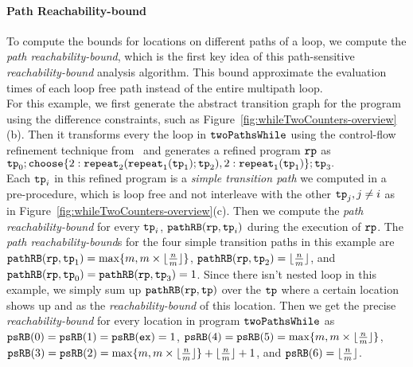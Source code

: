 \paragraph{Path Reachability-bound}
To compute the bounds for locations on different paths of a loop, we compute the \emph{path reachability-bound},
which is the first key idea of this path-sensitive \emph{reachability-bound} analysis algorithm. This bound approximate the evaluation times of each loop free path instead of the entire multipath loop.
\\
For this example, we first
generate the abstract transition graph for the program using the difference constraints, such as Figure~\ref{fig:whileTwoCounters-overview}(b).
Then it transforms every the loop in $\mathtt{twoPathsWhile}$ using the control-flow refinement technique from~\cite{GulwaniJK09} and generates a refined program $\mathtt{rp}$ as
\\
% 
  $
  \tpath_0 ; 
  \rpchoose{2: \rprepeat_2(\rprepeat_1(\tpath_1); \tpath_2), 
  2: \rprepeat_1(\tpath_1)}; \tpath_3.
  $
\\
Each $\mathtt{tp}_i$ in this refined program is a \emph{simple transition path} we computed in a pre-procedure, which is loop free and not interleave with the other $\mathtt{tp}_j, j \neq i$ as in Figure~\ref{fig:whileTwoCounters-overview}(c).
Then we compute the \emph{path reachability-bound} for every $\mathtt{tp}_i$,
$\mathtt{pathRB}(\mathtt{rp}, \mathtt{tp}_i)$ during the execution of $\mathtt{rp}$.
The \emph{path reachability-bound}s for the four simple transition paths in this example are
$\mathtt{pathRB}(\mathtt{rp}, \mathtt{tp}_1) = \max\{m, m \times \lfloor\frac{n}{m}\rfloor\}$,
$\mathtt{pathRB}(\mathtt{rp}, \mathtt{tp}_2) = \lfloor\frac{n}{m}\rfloor$,
and $\mathtt{pathRB}(\mathtt{rp}, \mathtt{tp}_0) = \mathtt{pathRB}(\mathtt{rp}, \mathtt{tp}_3) = 1$.
Since there isn't nested loop in this example, we simply sum up $\mathtt{pathRB}(\mathtt{rp}, \mathtt{tp})$ over the $\mathtt{tp}$ where a certain location shows up
and as the \emph{reachability-bound} of this location.
Then we get the precise \emph{reachability-bound} for every location in program $\mathtt{twoPathsWhile}$ as
$\mathtt{psRB}(0) = \mathtt{psRB}(1) = \mathtt{psRB}(\mathtt{ex}) = 1$,
$\mathtt{psRB}(4) = \mathtt{psRB}(5) = \max\{m, m \times \lfloor\frac{n}{m}\rfloor\}$,
$\mathtt{psRB}(3) = \mathtt{psRB}(2) = \max\{m, m \times \lfloor\frac{n}{m}\rfloor\} + \lfloor\frac{n}{m}\rfloor + 1 $,
and $\mathtt{psRB}(6) = \lfloor\frac{n}{m}\rfloor$.
%
